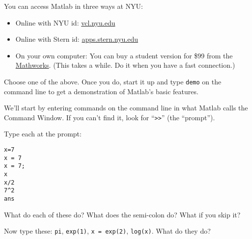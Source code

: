 \documentclass[11pt]{exam}
\begin{document}
\begin{questions}
You can access Matlab in three ways at NYU:
\begin{itemize}
\item Online with NYU id:  \url{vcl.nyu.edu}
\item Online with Stern id: \url{apps.stern.nyu.edu}
\item On your own computer:  You can buy a student version for \$99
from the
\href{http://www.mathworks.com/academia/students.html}{Mathworks}.
(This takes a while. Do it when you have a fast connection.)
\end{itemize}

Choose one of the above.
Once you do, start it up and type
{\tt demo} on the command line to get a demonstration of Matlab's basic
features.

 We'll start by entering commands on the command line
in what Matlab calls the Command Window.
If you can't find it, look for ``{\tt >>}'' (the ``prompt'').
\begin{parts}
\item  Type each at the prompt:
\begin{verbatim}
x=7
x = 7
x = 7;
x
x/2
7^2
ans
\end{verbatim}
What do each of these do? What does the semi-colon do?  What if you skip it?
\item  Now type these: {\tt pi}, {\tt exp(1)}, {\tt x = exp(2)}, {\tt log(x)}.
What do they do?
\end{parts}


\end{questions}
\end{document}
